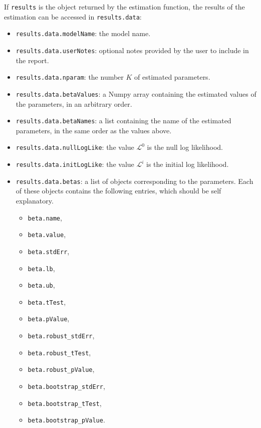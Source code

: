 \documentclass[12pt,a4paper]{article}
\begin{document}
If \lstinline+results+ is the object returned by the estimation
function, the results of the estimation can be accessed in
\lstinline+results.data+:
\begin{itemize}
\item \lstinline+results.data.modelName+: the model name.
\item \lstinline+results.data.userNotes+: optional notes provided by the user to include in the report.
\item \lstinline+results.data.nparam+: the number $K$ of estimated parameters.
\item \lstinline+results.data.betaValues+: a Numpy array containing
  the estimated values of the parameters, in an arbitrary order.
\item \lstinline+results.data.betaNames+: a list containing the name
  of the estimated parameters, in the same order as the values above.
\item \lstinline+results.data.nullLogLike+: the value $\mathcal{L}^0$
  is the null log likelihood. 
\item \lstinline+results.data.initLogLike+: the value $\mathcal{L}^i$
  is the initial log likelihood. 
\item \lstinline+results.data.betas+: a list of objects corresponding
  to the parameters. Each of these objects contains the following
  entries, which should be self explanatory. 
\begin{itemize}
\item \lstinline+beta.name+,
\item \lstinline+beta.value+,
\item \lstinline+beta.stdErr+,
\item \lstinline+beta.lb+,
\item \lstinline+beta.ub+,
\item \lstinline+beta.tTest+,
\item \lstinline+beta.pValue+,
\item \lstinline+beta.robust_stdErr+,
\item \lstinline+beta.robust_tTest+,
\item \lstinline+beta.robust_pValue+,
\item \lstinline+beta.bootstrap_stdErr+,
\item \lstinline+beta.bootstrap_tTest+,
\item \lstinline+beta.bootstrap_pValue+.
\end{itemize}
  

\end{itemize}
\end{document}
